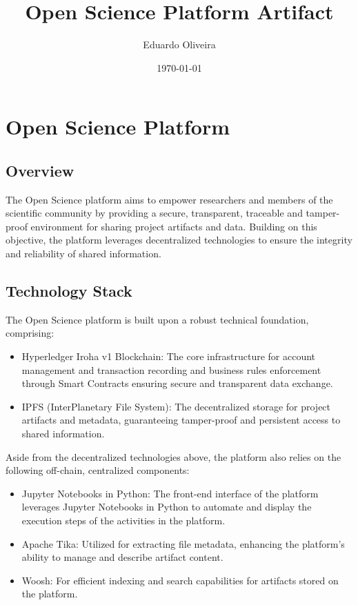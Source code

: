 \documentclass{article}
\title{Open Science Platform Artifact}
\author{Eduardo Oliveira}
\date{\today}
\begin{document}
\maketitle

\section{Open Science Platform}

\subsection{Overview}

The Open Science platform aims to empower researchers and members of the scientific community by providing a secure, transparent, traceable and tamper-proof environment for sharing project artifacts and data. Building on this objective, the platform leverages decentralized technologies to ensure the integrity and reliability of shared information.


\subsection{Technology Stack}

The Open Science platform is built upon a robust technical foundation, comprising:

\begin{itemize}
      \item Hyperledger Iroha v1 Blockchain: The core infrastructure for account management and transaction recording and business rules enforcement through Smart Contracts ensuring secure and transparent data exchange.
      \item IPFS (InterPlanetary File System): The decentralized storage for project artifacts and metadata, guaranteeing tamper-proof and persistent access to shared information.
\end{itemize}


Aside from the decentralized technologies above, the platform also relies on the following off-chain, centralized components:

\begin{itemize}
      \item Jupyter Notebooks in Python: The front-end interface of the platform leverages Jupyter Notebooks in Python to automate and display the execution steps of the activities in the platform.
      \item Apache Tika: Utilized for extracting file metadata, enhancing the platform's ability to manage and describe artifact content.
      \item Woosh: For efficient indexing and search capabilities for artifacts stored on the platform.
\end{itemize}
\end{document}

